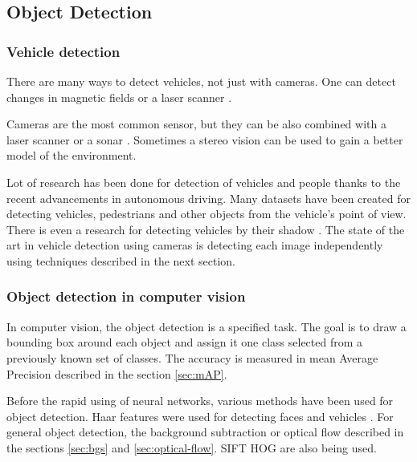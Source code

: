 \documentclass[a4paper,12pt,titlepage, twoside]{article}
\numberwithin{figure}{section}
\begin{document}
\subsection{Object Detection}
\label{sec:detection}
\subsubsection{Vehicle detection}
There are many ways to detect vehicles, not just with cameras. One can detect changes in magnetic fields \cite{daubaras2012vehicle, caruso1999vehicle} or a laser scanner \cite{gate2009fast}.

Cameras are the most common sensor, but they can be also combined with a laser scanner \cite{wender20083d, premebida2007lidar} or a sonar \cite{kim2005front, wang2003online}. Sometimes a stereo vision \cite{bertozzi2000stereo, toulminet2006vehicle} can be used to gain a better model of the environment.

Lot of research has been done for detection of vehicles and people thanks to the recent advancements in autonomous driving. Many datasets have been created \cite{apollo-scape, madhavan2017bdd, RobotCarDatasetIJRR, ncarlevaris-2015a} for detecting vehicles, pedestrians and other objects from the vehicle's point of view. There is even a research for detecting vehicles by their shadow \cite{tzomakas1998vehicle}. The state of the art in vehicle detection using cameras is detecting each image independently using techniques described in the next section.


\subsubsection{Object detection in computer vision}
\label{sec:object_detection}
In computer vision, the object detection is a specified task. The goal is to draw a bounding box around each object and assign it one class selected from a previously known set of classes. The accuracy is measured in mean Average Precision described in the section \ref{sec:mAP}. 

Before the rapid using of neural networks, various methods have been used for object detection. Haar features were used for detecting faces \cite{haar, lienhart2002extended, viola2004robust} and vehicles \cite{sun2002real}. For general object detection, the background subtraction \cite{piccardi2004background, horprasert1999statistical} or optical flow \cite{naoya1990optical, quenot1992orthogonal, chen2011tracking} described in the sections \ref{sec:bgs} and \ref{sec:optical-flow}. SIFT \cite{lowe2004distinctive} HOG \cite{girshick2014rich, wang2009hog, zhu2006fast, felzenszwalb2010object, dalal2005histograms} are also being used.
\end{document}

